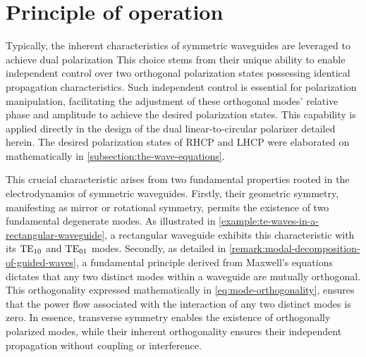 \documentclass[11pt,a4paper,twoside,openany]{report}
\begin{document}
\section{Principle of operation}
Typically, the inherent characteristics of symmetric waveguides are leveraged to achieve dual polarization This choice stems from their unique ability to enable independent control over two orthogonal polarization states possessing identical propagation characteristics. Such independent control is essential for polarization manipulation, facilitating the adjustment of these orthogonal modes' relative phase and amplitude to achieve the desired polarization states. This capability is applied directly in the design of the dual linear-to-circular polarizer detailed herein. The desired polarization states of RHCP and LHCP were elaborated on mathematically in \cref{subsection:the-wave-equations}.

This crucial characteristic arises from two fundamental properties rooted in the electrodynamics of symmetric waveguides. Firstly, their geometric symmetry, manifesting as mirror or rotational symmetry, permits the existence of two fundamental degenerate modes. As illustrated in \cref{example:te-waves-in-a-rectangular-waveguide}, a rectangular waveguide exhibits this characteristic with its $\text{TE}_{10}$ and $\text{TE}_{01}$ modes. Secondly, as detailed in \cref{remark:modal-decomposition-of-guided-waves}, a fundamental principle derived from Maxwell's equations dictates that any two distinct modes within a waveguide are mutually orthogonal. This orthogonality expressed mathematically in \cref{eq:mode-orthogonality}, ensures that the power flow associated with the interaction of any two distinct modes is zero. In essence, transverse symmetry enables the existence of orthogonally polarized modes, while their inherent orthogonality ensures their independent propagation without coupling or interference.
\end{document}
